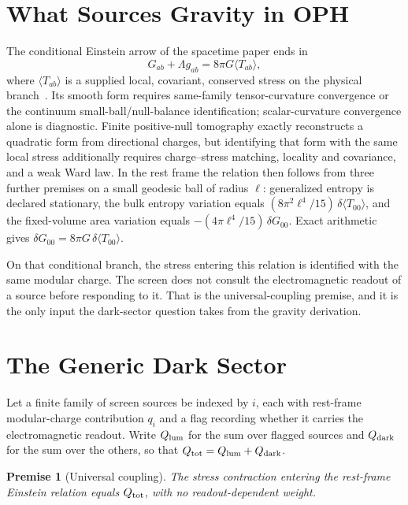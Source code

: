 \documentclass[11pt]{article}
\newtheorem{premise}[theorem]{Premise}
\begin{document}
\tableofcontents

\section{What Sources Gravity in OPH}

The conditional Einstein arrow of the spacetime paper ends in
\begin{equation}
G_{ab}+\Lambda g_{ab}=8\pi G\langle T_{ab}\rangle,
\label{eq:einstein}
\end{equation}
where \(\langle T_{ab}\rangle\) is a supplied local, covariant, conserved
stress on the physical branch~\cite{ophEinstein}. Its smooth form requires
same-family tensor-curvature convergence or the continuum
small-ball/null-balance identification; scalar-curvature convergence alone is
diagnostic. Finite positive-null
tomography exactly reconstructs a quadratic form from directional charges,
but identifying that form with the same local stress additionally requires
charge--stress matching, locality and covariance, and a weak Ward law. In the
rest frame the relation then follows from three further premises on a small
geodesic ball of radius \(\ell\): generalized entropy is declared stationary,
the bulk entropy variation equals
\((8\pi^2\ell^4/15)\,\delta\langle T_{00}\rangle\), and the fixed-volume area
variation equals \(-(4\pi\ell^4/15)\,\delta G_{00}\). Exact arithmetic gives
\(\delta G_{00}=8\pi G\,\delta\langle T_{00}\rangle\).

On that conditional branch, the stress entering this relation is identified
with the same modular charge. The screen does not
consult the electromagnetic readout of a source before responding to it. That
is the universal-coupling premise, and it is the only input the dark-sector
question takes from the gravity derivation.

\section{The Generic Dark Sector}
\label{sec:generic}

Let a finite family of screen sources be indexed by \(i\), each with
rest-frame modular-charge contribution \(q_i\) and a flag recording whether
it carries the electromagnetic readout. Write \(Q_{\rm lum}\) for the sum over
flagged sources and \(Q_{\rm dark}\) for the sum over the others, so that
\(Q_{\rm tot}=Q_{\rm lum}+Q_{\rm dark}\).

\begin{premise}[Universal coupling]
\label{pre:universal}
The stress contraction entering the rest-frame Einstein relation equals
\(Q_{\rm tot}\), with no readout-dependent weight.
\end{premise}
\end{document}
